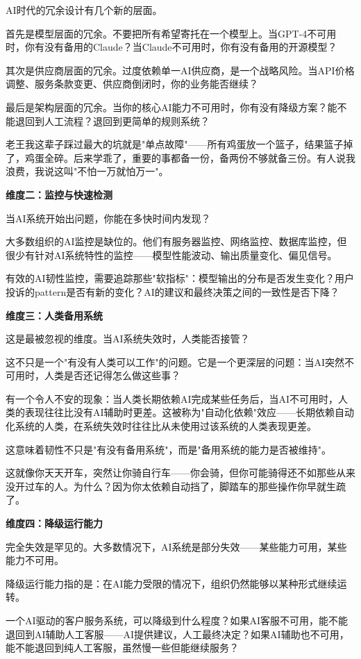 AI时代的冗余设计有几个新的层面。

首先是模型层面的冗余。不要把所有希望寄托在一个模型上。当GPT-4不可用时，你有没有备用的Claude？当Claude不可用时，你有没有备用的开源模型？

其次是供应商层面的冗余。过度依赖单一AI供应商，是一个战略风险。当API价格调整、服务条款变更、供应商倒闭时，你的业务能否继续？

最后是架构层面的冗余。当你的核心AI能力不可用时，你有没有降级方案？能不能退回到人工流程？退回到更简单的规则系统？

老王我这辈子踩过最大的坑就是"单点故障"——所有鸡蛋放一个篮子，结果篮子掉了，鸡蛋全碎。后来学乖了，重要的事都备一份，备两份不够就备三份。有人说我浪费，我说这叫"不怕一万就怕万一"。

\textbf{维度二：监控与快速检测}

当AI系统开始出问题，你能在多快时间内发现？

大多数组织的AI监控是缺位的。他们有服务器监控、网络监控、数据库监控，但很少有针对AI系统特性的监控——模型性能波动、输出质量变化、偏见信号。

有效的AI韧性监控，需要追踪那些"软指标"：模型输出的分布是否发生变化？用户投诉的pattern是否有新的变化？AI的建议和最终决策之间的一致性是否下降？

\textbf{维度三：人类备用系统}

这是最被忽视的维度。当AI系统失效时，人类能否接管？

这不只是一个"有没有人类可以工作"的问题。它是一个更深层的问题：当AI突然不可用时，人类是否还记得怎么做这些事？

有一个令人不安的现象：当人类长期依赖AI完成某些任务后，当AI不可用时，人类的表现往往比没有AI辅助时更差。这被称为"自动化依赖"效应——长期依赖自动化系统的人类，在系统失效时往往比从未使用过该系统的人类表现更差。

这意味着韧性不只是"有没有备用系统"，而是"备用系统的能力是否被维持"。

这就像你天天开车，突然让你骑自行车——你会骑，但你可能骑得还不如那些从来没开过车的人。为什么？因为你太依赖自动挡了，脚踏车的那些操作你早就生疏了。

\textbf{维度四：降级运行能力}

完全失效是罕见的。大多数情况下，AI系统是部分失效——某些能力可用，某些能力不可用。

降级运行能力指的是：在AI能力受限的情况下，组织仍然能够以某种形式继续运转。

一个AI驱动的客户服务系统，可以降级到什么程度？如果AI客服不可用，能不能退回到AI辅助人工客服——AI提供建议，人工最终决定？如果AI辅助也不可用，能不能退回到纯人工客服，虽然慢一些但能继续服务？

